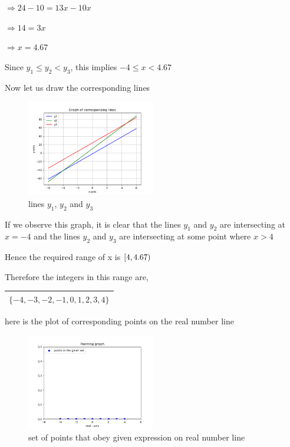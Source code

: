 \documentclass[16pt, a4paper, two column]{article}
\begin{document}
$\Rightarrow 24 - 10 = 13x - 10x$

$\Rightarrow 14 = 3x$

$\Rightarrow x = 4.67$


Since $y_1 \leq y_2 < y_3$, this implies $-4 \leq x < 4.67$


Now let us draw the corresponding lines

\begin{figure}[h]
    \centering
    \includegraphics[width = 0.5\textwidth]{Figure_1}
    \caption{lines $y_1$, $y_2$ and $y_3$}
    \label{fig:mesh1}
\end{figure}

If we observe this graph, it is clear that the lines $y_1$ and $y_2$ are intersecting at $x = -4$ and the lines $y_2$ and $y_3$ are intersecting at some point where $x>4$

Hence the required range of x is $[\-4, 4.67)\ $\newline


\vspace{10pt}
Therefore the integers in this range are,

\begin{center}
\begin{tabular}{|c|}
\hline
\textbf{$ \{ -4, -3, -2, -1, 0, 1, 2, 3, 4\}$} \\
\hline
\end{tabular}
\end{center}


here is the plot of corresponding points on the real number line\\
\begin{figure}[h]
    \centering
    \includegraphics[width = 0.5\textwidth]{Figure_2}
    \caption{set of points that obey given expression on real number line}
    \label{fig:mesh1}
\end{figure}
\end{document}
